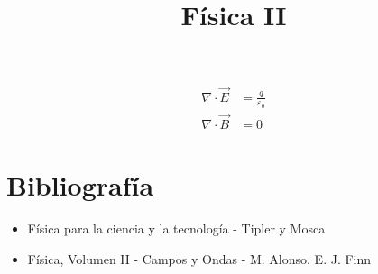 

\title{Física II}


\maketitle
\begin{equation}
	\begin{split}
		\nabla \cdot \vec{E} &= \frac{q}{\varepsilon_{0}}\\
		\nabla \cdot \vec{B} &= 0
	\end{split}
\end{equation}
\pagebreak
\tableofcontents
\pagebreak
\section{Bibliografía}
\begin{itemize}
	\item Física para la ciencia y la tecnología - Tipler y Mosca
	\item Física, Volumen II - Campos y Ondas - M. Alonso. E. J. Finn
\end{itemize}





